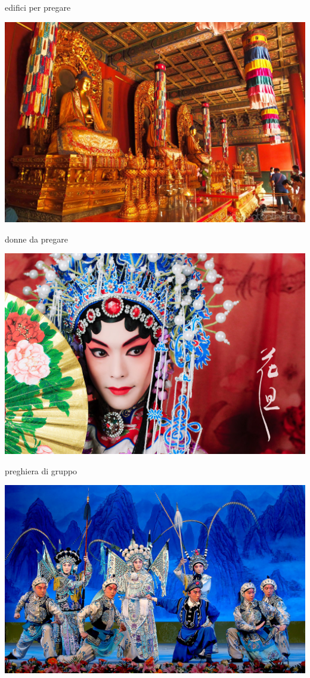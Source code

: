 \documentclass[presentation]{beamer}
\begin{document}
\begin{frame}[label={sec:org85a8581}]{edifici per pregare}
\begin{center}
\includegraphics[width=.9\linewidth]{./immagini/budda.jpg}
\end{center}
\end{frame}
\begin{frame}[label={sec:orgbc16820}]{donne da pregare}
\begin{center}
\includegraphics[width=.9\linewidth]{./immagini/gnocca.jpg}
\end{center}
\end{frame}
\begin{frame}[label={sec:org35f8a2e}]{preghiera di gruppo}
\begin{center}
\includegraphics[width=.9\linewidth]{./immagini/gnocche.jpg}
\end{center}
\end{frame}
\end{document}
